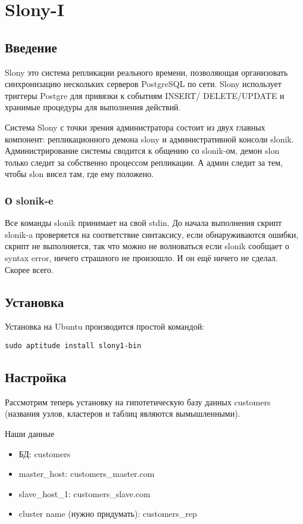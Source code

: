 \section{Slony-I}
\subsection{Введение}
Slony это система репликации реального времени, позволяющая организовать синхронизацию нескольких серверов 
PostgreSQL по сети. Slony использует триггеры Postgre для привязки к событиям INSERT/ DELETE/UPDATE и 
хранимые процедуры для выполнения действий.

Система Slony с точки зрения администратора состоит из двух главных компонент: репликационного демона slony и 
административной консоли slonik. Администрирование системы сводится к общению со slonik-ом, демон slon только 
следит за собственно процессом репликации. А админ следит за тем, чтобы slon висел там, где ему положено. 

\subsubsection{О slonik-e}
Все команды slonik принимает на свой stdin. До начала выполнения скрипт slonik-a проверяется на соответствие синтаксису, 
если обнаруживаются ошибки, скрипт не выполняется, так что можно не волноваться если slonik сообщает о syntax error, 
ничего страшного не произошло. И он ещё ничего не сделал. Скорее всего. 

\subsection{Установка}
Установка на Ubuntu производится простой командой:
\begin{lstlisting}[label=lst:slony1,caption=Установка]
sudo aptitude install slony1-bin
\end{lstlisting}

\subsection{Настройка}
\label{sec:slonyI}
Рассмотрим теперь установку на гипотетическую базу данных customers 
(названия узлов, кластеров и таблиц являются вымышленными).

Наши данные
\begin{itemize}
\item БД: customers
\item master\_host: customers\_master.com
\item slave\_host\_1: customers\_slave.com
\item cluster name (нужно придумать): customers\_rep
\end{itemize}

